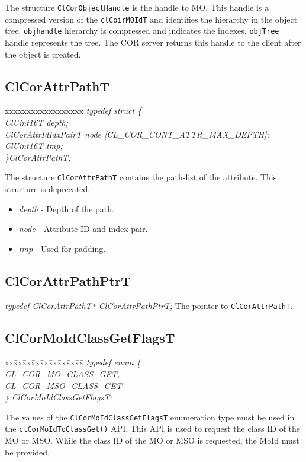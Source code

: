 \begin{flushleft}
The structure {\tt{ClCorObjectHandle}} is the handle to MO. This handle is a compressed version of the {\tt{clCoirMOIdT}} and identifies the
hierarchy in the object tree. {\tt{objhandle}} hierarchy is compressed and indicates the indexes. {\tt{objTree}} handle represents the tree. The COR 
server returns this handle to the client after the object is created. 



\subsection{ClCorAttrPathT}

\begin{tabbing}
xx\=xx\=xx\=xx\=xx\=xx\=xx\=xx\=xx\=\kill
\textit{typedef struct \{}\\
\>\>\>\>\textit{ClUint16T depth;}\\
\>\>\>\>\textit{ClCorAttrIdIdxPairT node \mbox{[}CL\_COR\_CONT\_ATTR\_MAX\_DEPTH\mbox{]};}\\
\>\>\>\>\textit{ClUint16T tmp;}\\
\textit{\}ClCorAttrPathT;}\end{tabbing}
The structure {\tt{ClCorAttrPathT}} contains the path-list of the attribute. This structure is deprecated.
 \begin{itemize}
\item
\textit{depth} - Depth of the path.
\item
\textit{node} - Attribute ID and index pair.
\item
\textit{tmp} - Used for padding.
\end{itemize}




\subsection{ClCorAttrPathPtrT}

\textit{typedef ClCorAttrPathT* ClCorAttrPathPtrT;}
\newline
\newline
The pointer to {\tt{ClCorAttrPathT}}.


\subsection{ClCorMoIdClassGetFlagsT}
\begin{tabbing}
xx\=xx\=xx\=xx\=xx\=xx\=xx\=xx\=xx\=\kill
\textit{typedef enum \{}\\
\>\>\>\>\textit{CL\_COR\_MO\_CLASS\_GET,}\\
\>\>\>\>\textit{CL\_COR\_MSO\_CLASS\_GET}\\
\textit{\} ClCorMoIdClassGetFlagsT;}\end{tabbing}
The values of the {\tt{ClCorMoIdClassGetFlagsT}} enumeration type must be used in the 
{\tt{clCorMoIdToClassGet()}} API. This API is used to request the class ID of the MO or MSO. While the class ID of the MO or MSO is requested,
the MoId must be provided.




\end{flushleft}
